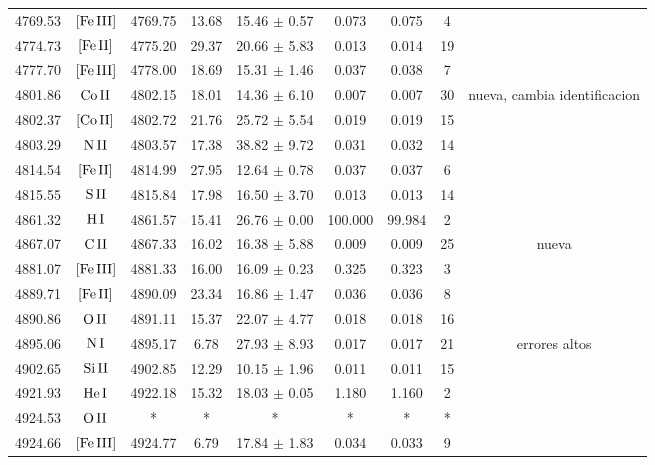 \documentclass{article}
\begin{document}
\begin{table*}
\begin{adjustbox}{width=\textwidth}
\begin{tabular}{ccccccccc}
4769.53 & $\mbox{[Fe}\thinspace \mbox{III]}$ & 4769.75 & 13.68 & 15.46 $\pm$ 0.57 & 0.073 & 0.075 & 4 &  \\
4774.73 & $\mbox{[Fe}\thinspace \mbox{II]}$ & 4775.20 & 29.37 & 20.66 $\pm$ 5.83 & 0.013 & 0.014 & 19 &  \\
4777.70 & $\mbox{[Fe}\thinspace \mbox{III]}$ & 4778.00 & 18.69 & 15.31 $\pm$ 1.46 & 0.037 & 0.038 & 7 &  \\
4801.86 & $\mbox{Co}\thinspace \mbox{II}$ & 4802.15 & 18.01 & 14.36 $\pm$ 6.10 & 0.007 & 0.007 & 30 &  nueva, cambia identificacion \\
4802.37 & $\mbox{[Co}\thinspace \mbox{II]}$ & 4802.72 & 21.76 & 25.72 $\pm$ 5.54 & 0.019 & 0.019 & 15 &  \\
4803.29 & $\mbox{N}\thinspace \mbox{II}$ & 4803.57 & 17.38 & 38.82 $\pm$ 9.72 & 0.031 & 0.032 & 14 &  \\
4814.54 & $\mbox{[Fe}\thinspace \mbox{II]}$ & 4814.99 & 27.95 & 12.64 $\pm$ 0.78 & 0.037 & 0.037 & 6 &  \\
4815.55 & $\mbox{S}\thinspace \mbox{II}$ & 4815.84 & 17.98 & 16.50 $\pm$ 3.70 & 0.013 & 0.013 & 14 &  \\
4861.32 & $\mbox{H}\thinspace \mbox{I}$ & 4861.57 & 15.41 & 26.76 $\pm$ 0.00 & 100.000 & 99.984 & 2 &  \\
4867.07 & $\mbox{C}\thinspace \mbox{II}$ & 4867.33 & 16.02 & 16.38 $\pm$ 5.88 & 0.009 & 0.009 & 25 &  nueva \\
4881.07 & $\mbox{[Fe}\thinspace \mbox{III]}$ & 4881.33 & 16.00 & 16.09 $\pm$ 0.23 & 0.325 & 0.323 & 3 &  \\
4889.71 & $\mbox{[Fe}\thinspace \mbox{II]}$ & 4890.09 & 23.34 & 16.86 $\pm$ 1.47 & 0.036 & 0.036 & 8 &  \\
4890.86 & $\mbox{O}\thinspace \mbox{II}$ & 4891.11 & 15.37 & 22.07 $\pm$ 4.77 & 0.018 & 0.018 & 16 &  \\
4895.06 & $\mbox{N}\thinspace \mbox{I}$ & 4895.17 & 6.78 & 27.93 $\pm$ 8.93 & 0.017 & 0.017 & 21 &  errores altos \\
4902.65 & $\mbox{Si}\thinspace \mbox{II}$ & 4902.85 & 12.29 & 10.15 $\pm$ 1.96 & 0.011 & 0.011 & 15 &  \\
4921.93 & $\mbox{He}\thinspace \mbox{I}$ & 4922.18 & 15.32 & 18.03 $\pm$ 0.05 & 1.180 & 1.160 & 2 &  \\
4924.53 & $\mbox{O}\thinspace \mbox{II}$ & * & * & * & * & * & * &  \\
4924.66 & $\mbox{[Fe}\thinspace \mbox{III]}$ & 4924.77 & 6.79 & 17.84 $\pm$ 1.83 & 0.034 & 0.033 & 9 &  \\

\end{tabular}
\end{adjustbox}
\end{table*}
\end{document}
